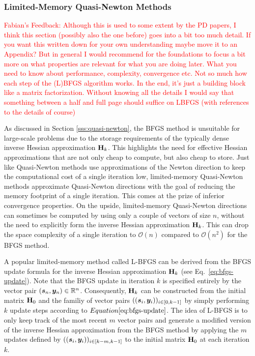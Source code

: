 \subsubsection{Limited-Memory Quasi-Newton Methods}\label{sss:limited-memory-quasi-newton}
\textcolor{red}{Fabian's Feedback: Although this is used to some extent by the PD papers, I think this section (possibly also the one before) 
goes into a bit too much detail. If you want this written down for your own understanding maybe move it to an Appendix? But in general I 
would recommend for the foundations to focus a bit more on what properties are relevant for what you are doing later.  What you need to 
know about performance, complexity, convergence etc. Not so much how each step of the (L)BFGS algorithm works. In the end, it's just a 
building block like a matrix factorization. Without knowing all the details I would say that something between a half and full page should 
suffice on LBFGS (with references to 
the details of course)}

As discussed in Section \ref{sss:quasi-newton}, the BFGS method is unsuitable for large-scale problems due to the storage requirements of the 
typically dense inverse Hessian approximation $\mathbf{H}_k$. This highlights the need for effective Hessian approximations that are not only
cheap to compute, but also cheap to store. Just like Quasi-Newton methods use approximations of the Newton direction to keep 
the computational cost of a single iteration low, limited-memory Quasi-Newton methods approximate Quasi-Newton directions with 
the goal of reducing the memory footprint of a single iteration. This comes at the prize of inferior convergence properties. On the upside,
limited-memory Quasi-Newton directions can sometimes be computed by using only a couple of vectors of size $n$, without the need to 
explicitly form the inverse Hessian approximation $\mathbf{H}_k$. This can drop the space complexity of a single iteration to $\mathcal{O}(n)$ 
compared to $\mathcal{O}(n^2)$ for the BFGS method.

A popular limited-memory method called L-BFGS can be derived from the BFGS update formula for the inverse Hessian approximation 
$\mathbf{H}_k$ (see Eq.\ \ref{eq:bfgs-update}). Note that the BFGS update in iteration $k$ is specified entirely 
by the vector 
pair $(\bm{s}_n, \bm{y}_n) \in \mathbb{R}^n$. Consequently, $\mathbf{H}_k$ can be constructed from the initial matrix $\mathbf{H}_0$ and the familiy 
of vector pairs $((\bm{s}_i, \bm{y}_i))_{i \in [0, k-1]}$ by simply performing $k$ update steps according to $Equation \ref{eq:bfgs-update}$.
The idea of L-BFGS is to only keep track of the most recent $m$ vector pairs and generate a modified version of the inverse Hessian 
approximation from the BFGS method by applying the $m$ updates defined by $((\bm{s}_i, \bm{y}_i))_{i \in [k-m, k-1]}$ to the 
initial matrix $\mathbf{H}_0$ at each iteration $k$.

